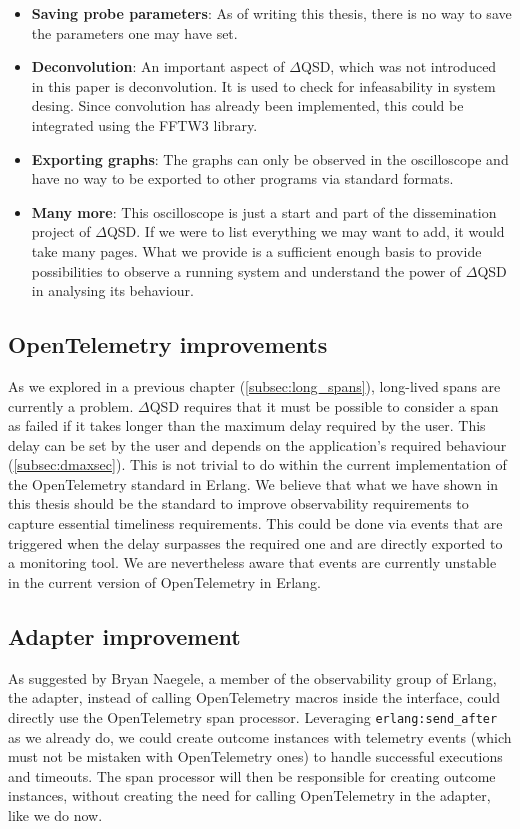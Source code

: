 \begin{itemize}
                \item \textbf{Saving probe parameters}: As of writing this thesis, there is no way to save the parameters one may have set. 
           
                \item \textbf{Deconvolution}: An important aspect of $\Delta$QSD, which was not introduced in this paper is deconvolution. It is used to check for infeasability in system desing. Since convolution has already been implemented, this could be integrated using the FFTW3 library. 

                \item \textbf{Exporting graphs}: The graphs can only be observed in the oscilloscope and have no way to be exported to other programs via standard formats.

                \item \textbf{Many more}: This oscilloscope is just a start and part of the dissemination project of $\Delta$QSD. If we were to list everything we may want to add, it would take many pages. What we provide is a sufficient enough basis to provide possibilities to observe a running system and understand the power of $\Delta$QSD in analysing its behaviour.
           \end{itemize} 
                
      \subsection{OpenTelemetry improvements}
        As we explored in a previous chapter (\cref{subsec:long_spans}), long-lived spans are currently a problem. $\Delta$QSD requires that it must be possible to consider a span as failed if it takes longer than the maximum delay required by the user. This delay can be set by the user and depends on the application's required behaviour (\cref{subsec:dmaxsec}). This is not trivial to do within the current implementation of the OpenTelemetry standard in Erlang. We believe that what we have shown in this thesis should be the standard to improve observability requirements to capture essential timeliness requirements. This could be done via events that are triggered when the delay surpasses the required one and are directly exported to a monitoring tool. We are nevertheless aware that events are currently unstable in the current version of OpenTelemetry in Erlang.

        \subsection{Adapter improvement}
         As suggested by Bryan Naegele, a member of the observability group of Erlang, the adapter, instead of calling OpenTelemetry macros inside the interface, could directly use the OpenTelemetry span processor. Leveraging \texttt{erlang:send\_after} as we already do, we could create outcome instances with telemetry \cite{telem-erl} events (which must not be mistaken with OpenTelemetry ones) to handle successful executions and timeouts. The span processor will then be responsible for creating outcome instances, without creating the need for calling OpenTelemetry in the adapter, like we do now.
   
